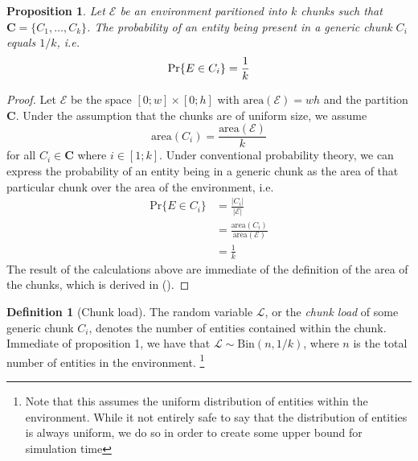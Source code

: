 \documentclass[a4paper, 12pt]{report}
\newtheorem{proposition}{Proposition}[chapter]
\theoremstyle{definition}
\newtheorem{definition}{Definition}[chapter]
\begin{document}
\begin{proposition}
    Let $\mathscr E$ be an environment paritioned into $k$ chunks such that $\mathbf C = \{C_1, \ldots, C_k\}$. The probability of an entity being present in a generic chunk $C_i$ equals $1/k$, i.e.
    \[
        \textnormal{Pr}\{E \in C_i\} = \frac 1k
    \]
\end{proposition}

\begin{proof}
    Let $\mathscr E$ be the space $[0; w] \times [0;h]$ with $\text{area}(\mathscr E) = wh$ and the partition $\mathbf C$. Under the assumption that the chunks
    are of uniform size, we assume
    \[
        \text{area}(C_i) = \frac{\text{area}(\mathscr E)}{k} \tag{\textasteriskcentered}
    \]
    for all $C_i \in \mathbf C$ where $i \in [1; k]$. Under conventional probability theory, we can express the probability of an entity being in a generic chunk as
    the area of that particular chunk over the area of the environment, i.e.
    \begin{align*}
        \text{Pr}\{E \in C_i\} &= \frac{|C_i|}{|\mathscr E|} \\
                               &= \frac{\text{area}(C_i)}{\text{area}(\mathscr E)} \\
                               &= \frac{1}{k}
    \end{align*}
    The result of the calculations above are immediate of the definition of the area of the chunks, which is derived in (\textasteriskcentered).
\end{proof}

\begin{definition}[Chunk load]
    The random variable $\mathcal L$, or the \emph{chunk load} of some generic chunk $C_i$,
    denotes the number of entities contained within the chunk. Immediate of proposition 1,
    we have that $\mathcal L \sim \text{Bin}(n, 1/k)$, where $n$ is the total number of entities
    in the environment. \footnote{Note that this assumes the uniform distribution of entities within
    the environment. While it not entirely safe to say that the distribution of entities is always uniform, we do so in order to create some upper bound for simulation time}
\end{definition}
\end{document}

